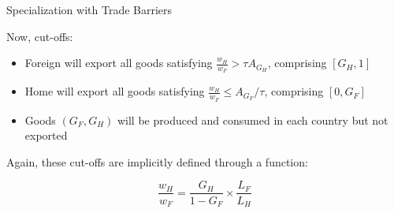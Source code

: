 \documentclass[notes,11pt, aspectratio=169, xcolor=table]{beamer}
\newenvironment{wideitemize}{\itemize\addtolength{\itemsep}{10pt}}{\enditemize}
\begin{document}
\begin{frame}{Specialization with Trade Barriers}
\begin{wideitemize}
    \item<1-> Now, cut-offs:

    \begin{itemize}
        \item Foreign will export all goods satisfying $\frac{w_H}{w_F} >  \tau A_{G_H}$, comprising  $[G_H,1]$
        \item Home will export all goods satisfying $\frac{w_H}{w_F} \le  A_{G_F} / \tau$, comprising   $[0,G_F]$
        \item Goods $(G_F, G_H)$ will be produced and consumed in each country but not exported
    \end{itemize}
    
    
    \item<2-> Again, these cut-offs are implicitly defined through a function:


\begin{equation*}
    \frac{w_H}{w_F} =  \frac{G_H}{1-G_F} \times \frac{ L_F }{L_H}
\end{equation*}

    \end{wideitemize}
\end{frame}
\end{document}
